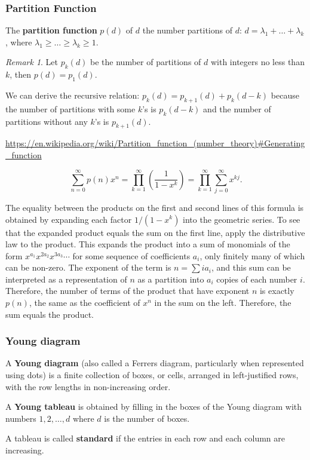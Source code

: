 \documentclass[12pt, letterpaper]{article}
\theoremstyle{definition}
\theoremstyle{remark}
\newtheorem*{rem*}{Remark}
\theoremstyle{definition}
\theoremstyle{plain}
\numberwithin{equation}{section}
\begin{document}
	\subsubsection{Partition Function}
	\begin{def*}
		The \textbf{partition function} $p(d)$ of $d$ the number partitions of $d$: $d = \lambda_1+\dots+\lambda_k$,
		where $\lambda_1\ge \dots \ge \lambda_k\ge 1$.
	\end{def*}
	\begin{rem*}
		Let $p_k(d)$ be the number of partitions of $d$ with integers no less than $k$,
		then $p(d)=p_1(d)$.
		
		We can derive the recursive relation:
		$p_k(d)=p_{k+1}(d)+p_k(d-k)$
		because the number of partitions with some $k$'s is $p_k(d-k)$
		and the number of partitions without any $k$'s is $p_{k+1}(d)$.
		
		\url{https://en.wikipedia.org/wiki/Partition_function_(number_theory)#Generating_function}
		
		\[\sum_{n=0}^{\infty}p(n)x^n=\prod_{k=1}^{\infty}\left(\frac{1}{1-x^k}\right)=\prod_{k=1}^{\infty}\sum_{j=0}^{\infty}x^{kj}.\]
		
		The equality between the products on the first and second lines of this formula is obtained by expanding each factor $1/(1-x^{k})$ into the geometric series. To see that the expanded product equals the sum on the first line, apply the distributive law to the product.
		This expands the product into a sum of monomials of the form  $x^{a_{1}}x^{2a_{2}}x^{3a_{3}}\cdots$ for some sequence of coefficients $a_{i}$, only finitely many of which can be non-zero. The exponent of the term is  $n=\sum ia_{i}$, and this sum can be interpreted as a representation of $n$ as a partition into $a_{i}$ copies of each number $i$.
		Therefore, the number of terms of the product that have exponent $n$ is exactly $p(n)$, the same as the coefficient of $x^{n}$ in the sum on the left. Therefore, the sum equals the product.
	\end{rem*}

	\subsubsection{Young diagram}

	\begin{def*}
		A \textbf{Young diagram} (also called a Ferrers diagram, particularly when represented using dots) is a finite
		collection of boxes, or cells, arranged in left-justified rows, with the row lengths in non-increasing order.
	\end{def*}
	\begin{def*}
		A \textbf{Young tableau} is obtained by filling in the boxes of the Young diagram with
		numbers $1,2,\dots,d$ where $d$ is the number of boxes.
	\end{def*}
	\begin{def*}
		A tableau is called \textbf{standard} if the entries in each row and each column are increasing.
	\end{def*}
	
\end{document}
